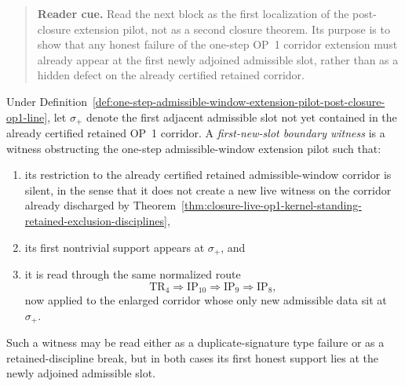 \begin{quote}\small
\noindent\textbf{Reader cue.} Read the next block as the first localization of the post-closure extension pilot, not as a second closure theorem. Its purpose is to show that any honest failure of the one-step OP~1 corridor extension must already appear at the first newly adjoined admissible slot, rather than as a hidden defect on the already certified retained corridor.
\end{quote}

\begin{definition}
\label{def:first-new-slot-boundary-witness-one-step-admissible-window-extension-pilot}
Under Definition~\ref{def:one-step-admissible-window-extension-pilot-post-closure-op1-line}, let $\sigma_{+}$ denote the first adjacent admissible slot not yet contained in the already certified retained OP~1 corridor. A \emph{first-new-slot boundary witness} is a witness obstructing the one-step admissible-window extension pilot such that:
\begin{enumerate}[leftmargin=2em,label=(\roman*)]
 \item its restriction to the already certified retained admissible-window corridor is silent, in the sense that it does not create a new live witness on the corridor already discharged by Theorem~\ref{thm:closure-live-op1-kernel-standing-retained-exclusion-disciplines},
 \item its first nontrivial support appears at $\sigma_{+}$, and
 \item it is read through the same normalized route
 \[
 \mathrm{TR}_4 \Longrightarrow \mathrm{IP}_{10} \Longrightarrow \mathrm{IP}_9 \Longrightarrow \mathrm{IP}_8,
 \]
 now applied to the enlarged corridor whose only new admissible data sit at $\sigma_{+}$.
\end{enumerate}
Such a witness may be read either as a duplicate-signature type failure or as a retained-discipline break, but in both cases its first honest support lies at the newly adjoined admissible slot.
\end{definition}


